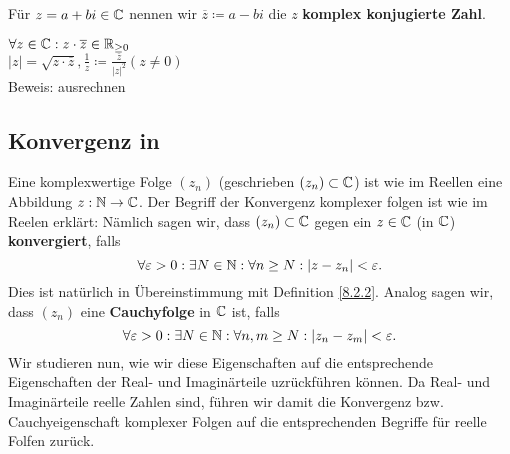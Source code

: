 \begin{subdefinition}
	Für $ z = a + bi \in \mathbb{C}  $ nennen wir $ \overline{z} \coloneqq a - bi $ die $ z $ \textbf{komplex konjugierte Zahl}.
\end{subdefinition}

\begin{sublemma}
	$ \forall z \in \mathbb{C} : z \cdot \overline{z} \in \mathbb{R}_{\geq 0} $\\
	$ \left| z \right| = \sqrt{z \cdot \overline{z} } , \frac{ 1 }{ z } \coloneqq \frac{\overline{z}}{ \left| z \right|^2 } (z \neq 0) $\\
	Beweis: ausrechnen
\end{sublemma}

\subsection{Konvergenz in }
Eine komplexwertige Folge $ (z_n) $ (geschrieben $ (z_n) \subset \mathbb{C}  $) ist wie im Reellen eine Abbildung $ z : \mathbb{N} \to \mathbb{C}  $. Der Begriff der Konvergenz komplexer folgen ist wie im Reelen erklärt:
Nämlich sagen wir, dass $ (z_n) \subset \mathbb{C}  $ gegen ein $ z \in \mathbb{C}  $ (in $ \mathbb{C}  $) \textbf{konvergiert}, falls
\[
	\forall \varepsilon > 0 : \exists N \in \mathbb{N} : \forall n \geq N : \left| z - z_n \right| < \varepsilon .
\]
Dies ist natürlich in Übereinstimmung mit Definition \ref{8.2.2}. Analog sagen wir, dass $ (z_n) $ eine \textbf{Cauchyfolge} in $ \mathbb{C}  $ ist, falls
\[
	\forall \varepsilon > 0 : \exists N \in \mathbb{N} : \forall n, m \geq N : \left| z_n - z_m \right| < \varepsilon .
\]
Wir studieren nun, wie wir diese Eigenschaften auf die entsprechende Eigenschaften der Real- und Imaginärteile uzrückführen können. Da Real- und Imaginärteile reelle Zahlen sind, führen wir damit die Konvergenz bzw. Cauchyeigenschaft komplexer Folgen auf die entsprechenden Begriffe für reelle Folfen zurück.

